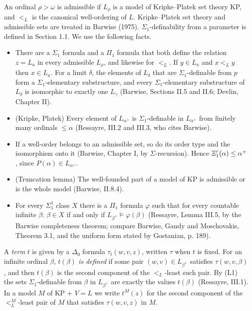 \documentclass[11pt]{article}
\begin{document}
An ordinal $\rho > \omega$ is admissible if $L_{\rho}$ is a model of Kripke--Platek set theory KP, and $<_L$ is the
canonical well-ordering of $L$. Kripke--Platek set theory and admissible sets are treated in Barwise (1975).
$\Sigma_1$-definability from a parameter is defined in Section 1.1. We use the following facts.
\begin{itemize}
\item[(L1)] There are a $\Sigma_1$ formula and a $\Pi_1$ formula that both define the relation $z = L_a$ in every
  admissible $L_{\rho}$, and likewise for $<_L$. If $y \in L_a$ and $x <_L y$ then $x \in L_a$. For a limit $\delta$,
  the elements of $L_{\delta}$ that are $\Sigma_1$-definable from $p$ form a $\Sigma_1$-elementary substructure, and
  every $\Sigma_1$-elementary substructure of $L_{\delta}$ is isomorphic to exactly one $L_{\gamma}$ (Barwise,
  Sections II.5 and II.6; Devlin, Chapter II).
\item[(L2)] (Kripke, Platek) Every element of $L_{\alpha^+}$ is $\Sigma_1$-definable in $L_{\alpha^+}$ from finitely
  many ordinals $\le \alpha$ (Ressayre, III.2 and III.3, who cites Barwise).
\item[(L3)] If a well-order belongs to an admissible set, so do its order type and the isomorphism onto it
  (Barwise, Chapter I, by $\Sigma$-recursion). Hence $\Xi'_1(\alpha) \le \alpha^+$, since $P(\alpha) \in L_{\alpha^+}$.
\item[(L4)] (Truncation lemma) The well-founded part of a model of KP is admissible or is the whole model
  (Barwise, II.8.4).
\item[(L5)] For every $\Sigma^1_1$ class $X$ there is a $\Pi_1$ formula $\varphi$ such that for every countable
  infinite $\beta$: $\beta \in X$ if and only if $L_{\beta^+} \models \varphi(\beta)$ (Ressayre, Lemma III.5, by the
  Barwise completeness theorem; compare Barwise, Gandy and Moschovakis, Theorem 3.1, and the uniform form stated
  by Gostanian, p. 189).
\end{itemize}

A \emph{term} $t$ is given by a $\Delta_0$ formula $\tau_t(w, v, z)$, written $\tau$ when $t$ is fixed. For an
infinite ordinal $\beta$, $t(\beta)$ \emph{is defined}
if some pair $(w, v) \in L_{\beta^+}$ satisfies $\tau(w, v, \beta)$, and then $t(\beta)$ is the second component of
the $<_L$-least such pair. By (L1) the sets $\Sigma_1$-definable from $\beta$ in $L_{\beta^+}$ are exactly the
values $t(\beta)$ (Ressayre, III.1). In a model $M$ of KP + $V = L$ we write $t^M(z)$ for the second component of
the $<_L^M$-least pair of $M$ that satisfies $\tau(w, v, z)$ in $M$.
\end{document}
